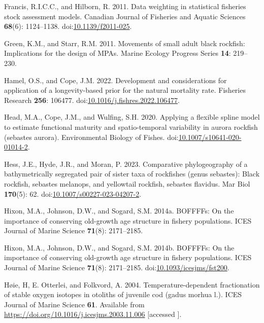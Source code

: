 \documentclass[11pt,
  english,
  letterpaper,
]{article}
\newlength{\cslhangindent}
\newenvironment{CSLReferences}[2] %
 {%
  \setlength{\parindent}{0pt}
  \ifodd #1 \everypar{\setlength{\hangindent}{\cslhangindent}}\ignorespaces\fi
  \ifnum #2 > 0
  \setlength{\parskip}{#2\baselineskip}
  \fi
 }%
 {}
\begin{document}
\begin{CSLReferences}{1}{0}
\leavevmode{}%
Francis, R.I.C.C., and Hilborn, R. 2011. Data weighting in statistical fisheries stock assessment models. Canadian Journal of Fisheries and Aquatic Sciences \textbf{68}(6): 1124--1138. doi:\href{https://doi.org/10.1139/f2011-025}{10.1139/f2011-025}.

\leavevmode{}%
Green, K.M., and Starr, R.M. 2011. Movements of small adult black rockfish: Implications for the design of MPAs. Marine Ecology Progress Series \textbf{14}: 219--230.

\leavevmode{}%
Hamel, O.S., and Cope, J.M. 2022. Development and considerations for application of a longevity-based prior for the natural mortality rate. Fisheries Research \textbf{256}: 106477. doi:\href{https://doi.org/10.1016/j.fishres.2022.106477}{10.1016/j.fishres.2022.106477}.

\leavevmode{}%
Head, M.A., Cope, J.M., and Wulfing, S.H. 2020. Applying a flexible spline model to estimate functional maturity and spatio-temporal variability in aurora rockfish (sebastes aurora). Environmental Biology of Fishes. doi:\href{https://doi.org/10.1007/s10641-020-01014-2}{10.1007/s10641-020-01014-2}.

\leavevmode{}%
Hess, J.E., Hyde, J.R., and Moran, P. 2023. Comparative phylogeography of a bathymetrically segregated pair of sister taxa of rockfishes (genus sebastes): Black rockfish, sebastes melanops, and yellowtail rockfish, sebastes flavidus. Mar Biol \textbf{170}(5): 62. doi:\href{https://doi.org/10.1007/s00227-023-04207-2}{10.1007/s00227-023-04207-2}.

\leavevmode{}%
Hixon, M.A., Johnson, D.W., and Sogard, S.M. 2014a. BOFFFFs: On the importance of conserving old-growth age structure in fishery populations. ICES Journal of Marine Science \textbf{71}(8): 2171--2185.

\leavevmode{}%
Hixon, M.A., Johnson, D.W., and Sogard, S.M. 2014b. {BOFFFFs}: On the importance of conserving old-growth age structure in fishery populations. {ICES} Journal of Marine Science \textbf{71}(8): 2171--2185. doi:\href{https://doi.org/10.1093/icesjms/fst200}{10.1093/icesjms/fst200}.

\leavevmode{}%
Høie, H, E. Otterlei, and Folkvord, A. 2004. Temperature-dependent fractionation of stable oxygen isotopes in otoliths of juvenile cod (gadus morhua l.). ICES Journal of Marine Science \textbf{61}. Available from \url{https://doi.org/10.1016/j.icesjms.2003.11.006} {[}accessed {]}.


\end{CSLReferences}
\end{document}
